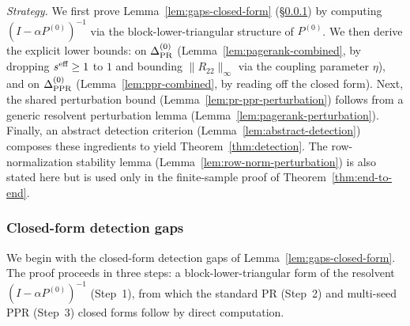 \documentclass{article}
\theoremstyle{plain}
\theoremstyle{definition}
\newcommand{\arXivtag}[1][]{#1}
\begin{document}
\emph{Strategy.} We first prove Lemma~\ref{lem:gaps-closed-form} (\S\ref{sec:proof-gaps-closed-form}) by computing $(I-\alpha P^{(0)})^{-1}$ via the block-lower-triangular structure of $P^{(0)}$. We then derive the explicit lower bounds: on $\Delta^{(0)}_{\textnormal{PR}}$ (Lemma~\ref{lem:pagerank-combined}, by dropping $s^{\textnormal{eff}} \geq 1$ to $1$ and bounding $\|R_{22}\|_\infty$ via the coupling parameter $\eta$), and on $\Delta^{(0)}_{\textnormal{PPR}}$ (Lemma~\ref{lem:ppr-combined}, by reading off the closed form). Next, the shared perturbation bound (Lemma~\ref{lem:pr-ppr-perturbation}) follows from a generic resolvent perturbation lemma (Lemma~\ref{lem:pagerank-perturbation})\arXivtag. Finally, an abstract detection criterion (Lemma~\ref{lem:abstract-detection}) composes these ingredients to yield Theorem~\ref{thm:detection}. The row-normalization stability lemma (Lemma~\ref{lem:row-norm-perturbation}) is also stated here but is used only in the finite-sample proof of Theorem~\ref{thm:end-to-end}.

\subsubsection{Closed-form detection gaps}\label{sec:proof-gaps-closed-form}

We begin with the closed-form detection gaps of Lemma~\ref{lem:gaps-closed-form}. The proof proceeds in three steps: a block-lower-triangular form of the resolvent $(I-\alpha P^{(0)})^{-1}$ (Step~1), from which the standard PR (Step~2) and multi-seed PPR (Step~3) closed forms follow by direct computation.
\end{document}
